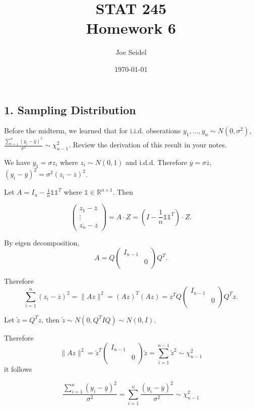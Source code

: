 \documentclass{tufte-book}
\title{STAT  245\\Homework 6}
\author{Joe Seidel}
\date{\today}
\begin{document}
\maketitle
{}
\newpage
{}

\subsection{1. Sampling Distribution}
Before the midterm, we learned that for i.i.d. obserations $y_1,...,y_n \sim N(0, \sigma^2)$, $\frac{\sum_{i=1}^n(y_i-\overline{y})^2}{\sigma^2} \sim \chi_{n-1}^2$.  Review the derivation of this result in your notes.

We have $y_1 = \sigma z_i$ where $z_i \sim N(0,1)$ and i.d.d.  Therefore $\overline{y}=\sigma \overline{z}$, $(y_i - \overline{y})^2 = \sigma^2(z_i-\overline{z})^2$.

Let $A= I_n - \frac{1}{n} \mathbb{1}\mathbb{1}^T$ where $\mathbb{1} \in \mathbb{R}^{n \times 1}$.  Then

\[
\begin{pmatrix}
z_1 - \overline{z}\\
\vdots \\
z_n - \overline{z}
\end{pmatrix}
= A \cdot Z = (I - \frac{1}{n}\mathbb{1}\mathbb{1}^T)\cdot Z.
\]

By eigen decomposition,
\[ A = Q
\begin{pmatrix}
I_{n-1} & \\
& 0\\
\end{pmatrix}
Q^T.
\]

Therefore
\[ \sum_{i=1}^n(z_i - \overline{z})^2 = \|Az\|^2 = (Az)^T(Az) = z^TQ\begin{pmatrix}
I_{n-1} & \\
& 0\\
\end{pmatrix}
Q^Tz. \]

Let $\tilde{z} = Q^Tz$, then $\tilde{z} \sim N(0, Q^TIQ) \sim N(0,I)$.

Therefore
\[ \|Az\|^2 = \tilde{z}^T\begin{pmatrix}
I_{n-1} & \\
& 0\\
\end{pmatrix}\tilde{z} = \sum_{i=1}^{n-1} \tilde{z}^2 \sim \chi_{n-1}^2 \]
it follows

\[ \frac{\sum_{i=1}^n (y_i - \overline{y})^2}{\sigma^2} =\sum_{i=1}^n \frac{(y_i-\overline{y})^2}{\sigma^2} \sim \chi_{n-1}^2 \]
\end{document}

